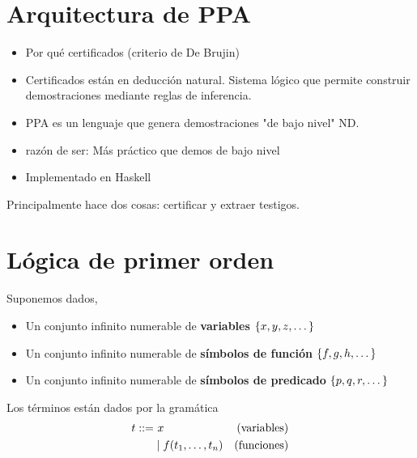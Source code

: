 \section{Arquitectura de PPA}

\begin{itemize}
    \item Por qué certificados (criterio de De Brujin)
    \item Certificados están en deducción natural. Sistema lógico que permite
    construir demostraciones mediante reglas de inferencia.
    \item PPA es un lenguaje que genera demostraciones "de bajo nivel" ND.
    \item razón de ser: Más práctico que demos de bajo nivel
    \item Implementado en Haskell
\end{itemize}

Principalmente hace dos cosas: certificar y extraer testigos.

\section{Lógica de primer orden}

Suponemos dados,

\begin{itemize}
    \item Un conjunto infinito numerable de \textbf{variables}
    \(
        \{x, y, z, \dots\}
    \)
    \item Un conjunto infinito numerable de \textbf{símbolos de función}
    \(
        \{f, g, h, \dots\}
    \)
    \item Un conjunto infinito numerable de \textbf{símbolos de predicado}
    \(
        \{p, q, r, \dots\}
    \)
\end{itemize}

\begin{definition}[Términos]
    Los términos están dados por la gramática
    \begin{align*}
        \term ::= &\ \var                               &\text{(variables)} \\
                  & \mid \fun(\term_1, \dots, \term_n) &\text{(funciones)}
    \end{align*}
\end{definition}

